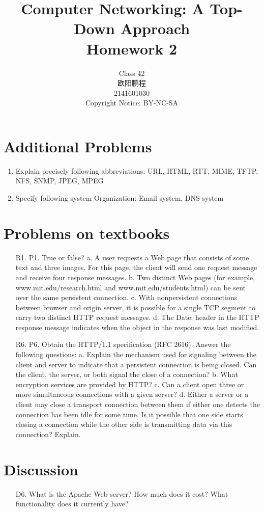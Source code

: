 \documentclass[]{article}
\title{Computer Networking: A Top-Down Approach \\ Homework 2}
\author{Class 42 \\ 欧阳鹏程 \\ 2141601030 \\ Copyright Notice: BY-NC-SA}
\begin{document}
\maketitle

\section{Additional Problems}
\begin{enumerate}
	\item Explain precisely following abbreviations:
	\subitem URL, HTML, RTT, MIME, TFTP, NFS, SNMP, JPEG, MPEG
	
	\item Specify following system Organization:
	\subitem Email system, DNS system
\end{enumerate}

\section{Problems on textbooks}
\begin{enumerate}
	\item[R1.] P1. True or false?
	a. A user requests a Web page that consists of some text and three images.
	For this page, the client will send one request message and receive four
	response messages.
	b. Two distinct Web pages (for example, www.mit.edu/research.html
	and www.mit.edu/students.html) can be sent over the same persistent connection.
	c. With nonpersistent connections between browser and origin server, it is possible for a single TCP segment to carry two distinct HTTP request messages.
	d. The Date: header in the HTTP response message indicates when the
	object in the response was last modified.
	
	\item[R6.] P6. Obtain the HTTP/1.1 specification (RFC 2616). Answer the following questions:
	a. Explain the mechanism used for signaling between the client and server
	to indicate that a persistent connection is being closed. Can the client, the
	server, or both signal the close of a connection?
	b. What encryption services are provided by HTTP?
	c. Can a client open three or more simultaneous connections with a given
	server?
	d. Either a server or a client may close a transport connection between them
	if either one detects the connection has been idle for some time. Is it possible that one side starts closing a connection while the other side is transmitting data via this connection? Explain.
\end{enumerate}

\section{Discussion}
\begin{enumerate}
	\item[D6.] What is the Apache Web server? How much does it cost? What functionality does it currently have?
\end{enumerate}
\end{document}
